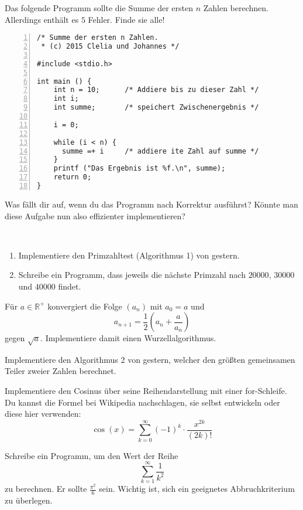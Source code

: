 \documentclass{uebungszettel}
\begin{document}
\begin{aufg}
Das folgende Programm sollte die Summe der ersten $n$
Zahlen berechnen.
Allerdings enth{\"a}lt es $5$ Fehler.
Finde sie alle! 

\begin{codelisting}
\begin{lstlisting}[numbers=left,numberstyle=\tiny,frame=tlrb,showstringspaces=false]
/* Summe der ersten n Zahlen.
 * (c) 2015 Clelia und Johannes */

#include <stdio.h>

int main () {
    int n = 10;      /* Addiere bis zu dieser Zahl */
    int i;
    int summe;       /* speichert Zwischenergebnis */   
    
    i = 0;
    
    while (i < n) {
      summe =+ i     /* addiere ite Zahl auf summe */
    }    
    printf ("Das Ergebnis ist %f.\n", summe);
    return 0;
}
\end{lstlisting}
\end{codelisting}
Was fällt dir auf, wenn du das Programm nach Korrektur ausführst? Könnte man diese Aufgabe nun also effizienter implementieren?
\end{aufg}

\begin{aufg}~
\begin{enumerate}
\item Implementiere den Primzahltest (Algorithmus 1) von gestern.
\item Schreibe ein Programm, dass jeweils die nächste Primzahl nach $20000$, $30000$ und $40000$ findet.
\end{enumerate}
\end{aufg}

\begin{aufg}
Für $a \in \mathbb{R}^+$ konvergiert die Folge $(a_n)$ mit $a_0 = a$ und
\[ a_{n+1} = \frac{1}{2}\left(a_n + \frac{a}{a_n}\right) \]
gegen $\sqrt{a}$. Implementiere damit einen Wurzellalgorithmus.
\end{aufg}

\begin{aufg}
Implementiere den Algorithmus 2 von gestern, welcher den größten gemeinsamen Teiler zweier Zahlen berechnet.
\end{aufg}

\begin{aufg}
Implementiere den Cosinus über seine Reihendarstellung mit einer for-Schleife. Du kannst die Formel bei Wikipedia nachschlagen, sie selbst entwickeln oder diese hier verwenden:
\[ \cos(x) = \sum_{k = 0}^{\infty}{(-1)^k \cdot \frac{x^{2k}}{(2k)!}} \]
\end{aufg}

\begin{aufg}
Schreibe ein Programm, um den Wert der Reihe
\[ \sum_{k = 1}^\infty \frac{1}{k^2} \]
zu berechnen. Er sollte $\frac{\pi^2}{6}$ sein. Wichtig ist, sich ein geeignetes Abbruchkriterium zu überlegen.
\end{aufg}
\end{document}
